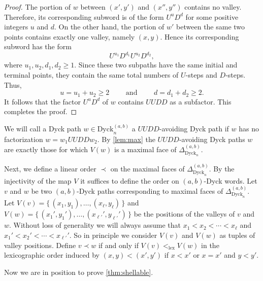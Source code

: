 \documentclass[11pt]{amsart}
\def\Dyck{\mathrm{Dyck}}
\theoremstyle{plain}
\numberwithin{lemma}{\DefaultNumberTheoremWithin}
\numberwithin{theorem}{\DefaultNumberTheoremWithin}
\numberwithin{corollary}{\DefaultNumberTheoremWithin}
\numberwithin{proposition}{\DefaultNumberTheoremWithin}
\numberwithin{conjecture}{\DefaultNumberTheoremWithin}
\theoremstyle{definition}
\numberwithin{definition}{\DefaultNumberTheoremWithin}
\numberwithin{question}{\DefaultNumberTheoremWithin}
\numberwithin{problem}{\DefaultNumberTheoremWithin}
\theoremstyle{remark}
\numberwithin{remark}{\DefaultNumberTheoremWithin}
\numberwithin{example}{\DefaultNumberTheoremWithin}
\numberwithin{claim}{\DefaultNumberTheoremWithin}
\begin{document}
\begin{proof}
The portion of $w$ between $(x',y')$ and $(x'',y'')$ contains no valley. Therefore, its corresponding subword is of the form $U^u D^d$  for some positive integers $u$ and $d$. On the other hand, the portion of $w'$ between the same two points contains exactly one valley, namely $(x,y)$. Hence its corresponding subword has the form \[ U^{u_1}D^{d_1}U^{u_2}D^{d_2}, \] where $u_1,u_2,d_1,d_2\geq 1$.  Since these two subpaths have the same initial and terminal points, they contain the same total numbers of $U$-steps and $D$-steps. Thus, \[ u=u_1+u_2\geq2 \qquad\text{ and }\qquad d=d_1+d_2\geq2. \] It follows that the factor $U^u D^d$ of $w$ contains $UUDD$ as a subfactor. This completes the proof. 

\end{proof}
     
  We will call a Dyck path $w \in \Dyck_n^{(a,b)}$ a $UUDD$-avoiding Dyck path if 
  $w$ has no factorization $w=w_1UUDDw_2$. By \ref{lem:max} the $UUDD$-avoiding Dyck paths 
  $w$ are
  exactly those for which $V(w)$ is a maximal face of $\Delta_{\Dyck_n}^{(a,b)}$.


Next, we define a linear order $\prec$ on the maximal faces of $\Delta^{(a,b)}_{\Dyck_n}$.
    By the injectivity of the map $V$ it suffices to define the order on 
    $(a,b)$-Dyck words.
    Let $v$ and $w$ be two $(a,b)$-Dyck paths corresponding to maximal faces of 
    $\Delta^{(a,b)}_{\Dyck_n}$.
    Let $V(v)=\big\{\,(x_1,y_1),\dots,(x_\ell,y_\ell)\,\big\}$ and
    $V(w) = \big\{\,(x_1',y_1'),\dots,(x_{\ell'}',y_{\ell'}')\,\big\}$ be the positions of the 
    valleys of $v$ 
    and $w$. Without loss of generality we will always 
    assume that $x_1<x_2<\cdots<x_\ell$ and $x_1' < x_2'< \cdots < x_{\ell'}'$. So in principle we
    consider $V(v)$ and $V(w)$ as tuples of valley positions.  
    Define $v \prec w$ if and only if $V(v) <_{\mathrm{lex}} V(w)$ in the lexicographic order
    induced by $(x,y)<(x',y')$ if $x<x'$ or $x=x'$ and $y<y'$.

 Now we are in position to prove \ref{thm:shellable}.
 
\end{document}
